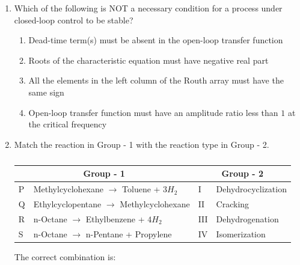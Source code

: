 \documentclass[journal,12pt,onecolumn]{IEEEtran}
\theoremstyle{remark}
\begin{document}
\begin{enumerate}
 

\item Which of the following is NOT a necessary condition for a process under closed-loop control to be stable?
\hfill{}
\begin{enumerate}
	\item Dead-time term(s) must be absent in the open-loop transfer function
	\item Roots of the characteristic equation must have negative real part
	\item All the elements in the left  column of the Routh array must have the same sign
	\item Open-loop transfer function must have an amplitude ratio less than $1$ at the critical frequency
\end{enumerate}

 

\item Match the reaction in Group - 1 with the reaction type in Group - 2.
\begin{table}[H]
\centering
\begin{tabularx}{\textwidth}{|l|X|l|X|}
	\hline
	\multicolumn{2}{|c|}{Group - 1} & \multicolumn{2}{c|}{Group - 2} \\
	\hline
	P & Methylcyclohexane $\rightarrow$ Toluene + $3H_{2}$ & I & Dehydrocyclization \\
	\hline
	Q & Ethylcyclopentane $\rightarrow$ Methylcyclohexane & II & Cracking \\
	\hline
	R & n-Octane $\rightarrow$ Ethylbenzene + $4H_{2}$ & III & Dehydrogenation \\
	\hline
	S & n-Octane $\rightarrow$ n-Pentane + Propylene & IV & Isomerization \\
	\hline
\end{tabularx}
\caption*{}
\label{tab:q33}
\end{table}
The correct combination is:
\hfill{}
\begin{enumerate}
\end{enumerate}

 


\end{enumerate}
\end{document}
